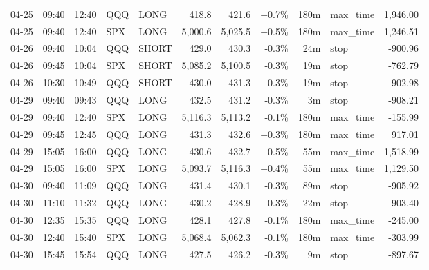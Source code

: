 \documentclass[11pt,a4paper,twoside]{article}
\begin{document}
\begin{center}
\begin{longtable}{>{\color{txtmain}}l l l l l r r r r >{\color{txtmain}}l r}
04-25 & 09:40 & 12:40 & QQQ & LONG & 418.8 & 421.6 & \textcolor{wingreen}{+0.7\%} & 180m & max\_time & \textcolor{wingreen}{1,946.00} \\
04-25 & 09:40 & 12:40 & SPX & LONG & 5,000.6 & 5,025.5 & \textcolor{wingreen}{+0.5\%} & 180m & max\_time & \textcolor{wingreen}{1,246.51} \\
04-26 & 09:40 & 10:04 & QQQ & SHORT & 429.0 & 430.3 & \textcolor{lossred}{-0.3\%} & 24m & stop & \textcolor{lossred}{-900.96} \\
04-26 & 09:45 & 10:04 & SPX & SHORT & 5,085.2 & 5,100.5 & \textcolor{lossred}{-0.3\%} & 19m & stop & \textcolor{lossred}{-762.79} \\
04-26 & 10:30 & 10:49 & QQQ & SHORT & 430.0 & 431.3 & \textcolor{lossred}{-0.3\%} & 19m & stop & \textcolor{lossred}{-902.98} \\
04-29 & 09:40 & 09:43 & QQQ & LONG & 432.5 & 431.2 & \textcolor{lossred}{-0.3\%} & 3m & stop & \textcolor{lossred}{-908.21} \\
04-29 & 09:40 & 12:40 & SPX & LONG & 5,116.3 & 5,113.2 & \textcolor{lossred}{-0.1\%} & 180m & max\_time & \textcolor{lossred}{-155.99} \\
04-29 & 09:45 & 12:45 & QQQ & LONG & 431.3 & 432.6 & \textcolor{wingreen}{+0.3\%} & 180m & max\_time & \textcolor{wingreen}{917.01} \\
04-29 & 15:05 & 16:00 & QQQ & LONG & 430.6 & 432.7 & \textcolor{wingreen}{+0.5\%} & 55m & max\_time & \textcolor{wingreen}{1,518.99} \\
04-29 & 15:05 & 16:00 & SPX & LONG & 5,093.7 & 5,116.3 & \textcolor{wingreen}{+0.4\%} & 55m & max\_time & \textcolor{wingreen}{1,129.50} \\
04-30 & 09:40 & 11:09 & QQQ & LONG & 431.4 & 430.1 & \textcolor{lossred}{-0.3\%} & 89m & stop & \textcolor{lossred}{-905.92} \\
04-30 & 11:10 & 11:32 & QQQ & LONG & 430.2 & 428.9 & \textcolor{lossred}{-0.3\%} & 22m & stop & \textcolor{lossred}{-903.40} \\
04-30 & 12:35 & 15:35 & QQQ & LONG & 428.1 & 427.8 & \textcolor{lossred}{-0.1\%} & 180m & max\_time & \textcolor{lossred}{-245.00} \\
04-30 & 12:40 & 15:40 & SPX & LONG & 5,068.4 & 5,062.3 & \textcolor{lossred}{-0.1\%} & 180m & max\_time & \textcolor{lossred}{-303.99} \\
04-30 & 15:45 & 15:54 & QQQ & LONG & 427.5 & 426.2 & \textcolor{lossred}{-0.3\%} & 9m & stop & \textcolor{lossred}{-897.67} \\

\end{longtable}
\end{center}
\end{document}
